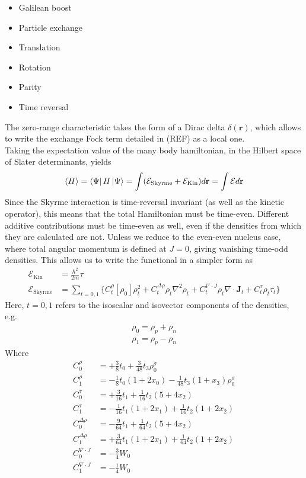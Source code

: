 \begin{itemize}
    \item Galilean boost
    \item Particle exchange
    \item Translation
    \item Rotation
    \item Parity
    \item Time reversal
\end{itemize}
The zero-range characteristic takes the form of a Dirac delta $\delta(\mathbf r)$, which allows to write the exchange Fock term detailed in (REF) as a local one.
\\Taking the expectation value of the many body hamiltonian, in the Hilbert space of Slater determinants, yields
\begin{equation}
    \label{eq:slater_exp}
    \expval{H} = \bra{\Psi} H \ket{\Psi} = \int (\mathcal E_\text{Skyrme} + \mathcal E_\text{Kin}) d\mathbf r = \int \mathcal E d\mathbf r
\end{equation}
Since the Skyrme interaction is time-reversal invariant (as well as the kinetic operator), this means that the total Hamiltonian must be time-even.
Different additive contributions must be time-even as well, even if the densities from which they are calculated are not. Unless we reduce to the even-even nucleus case, where total angular momentum is defined at $J=0$, giving vanishing time-odd densities.
This allows us to write the functional in a simpler form as \cite{stevenson2019low}
\begin{align}
    \mathcal E_\text{Kin} &= \frac{\hbar^2}{2m}\tau \label{eq:kinfunc}\\
    \mathcal E_\text{Skyrme} &= \sum_{t=0,1}\bigg\{C_t^\rho [\rho_0]\rho_t^2+C_t^{\Delta \rho}\rho_t\nabla^2\rho_t+C_t^{\nabla\cdot J}\rho_t\nabla\cdot \mathbf J_t + C_t^\tau\rho_t\tau_t\bigg\}\label{eq:skfunc}
\end{align}
Here, $t=0,1$ refers to the isoscalar and isovector components of the densities, e.g.
\begin{align*}
    \rho_0 = \rho_p + \rho_n
    \\\rho_1 = \rho_p - \rho_n
\end{align*}
Where
\begin{align}
    \label{eq:coefficients_func}
    C_0^\rho &= +\frac 3 8 t_0 + \frac 3 {48} t_3\rho_0^\sigma 
    \\C_1^\rho &= -\frac 1 8 t_0(1+2x_0)- \frac 1 {48} t_3(1+x_3)\rho_0^\sigma 
    \\C_0^\tau &= +\frac 3 {16} t_1 + \frac 1 {16} t_2 (5+4x_2)
    \\C_1^\tau &= -\frac 1 {16} t_1(1+2x_1)+\frac 1 {16}t_2(1+2x_2)
    \\C_0^{\Delta \rho} &= -\frac 9 {64}t_1+\frac 1 {64}t_2(5+4x_2)
    \\C_1^{\Delta \rho} &= +\frac 3 {64}t_1(1+2x_1)+\frac 1 {64}t_2(1+2x_2)
    \\C_0^{\nabla\cdot J} &= -\frac 3 4 W_0
    \\C_1^{\nabla\cdot J} &= -\frac 1 4 W_0
\end{align}
